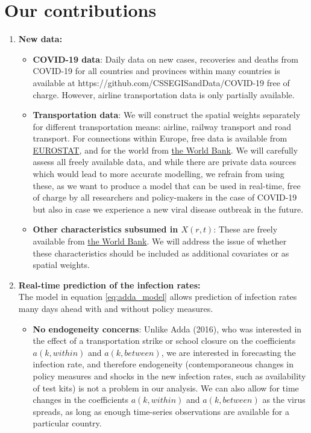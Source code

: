 \documentclass{article}
\begin{document}
\section{Our contributions}
\begin{enumerate}
    \item \textbf{New data:}
        \begin{itemize}
            \item \textbf{COVID-19 data}: Daily data on new cases, recoveries and deaths from COVID-19 for all countries and provinces within many countries is available at https://github.com/CSSEGISandData/COVID-19 free of charge. However, airline transportation data is only partially available.
            \item \textbf{Transportation data}: We will construct the spatial weights separately for different transportation means: airline, railway transport and road transport. For connections within Europe, free data is available from \href{https://ec.europa.eu/eurostat/web/transport/data/main-tables}{EUROSTAT}, and for the world from \href{http://wdi.worldbank.org/table/5.10}{the World Bank}. We will carefully assess all freely available data, and while there are private data sources which would lead to more accurate modelling, we refrain from using these, as we want to produce a model that can be used in real-time, free of charge by all researchers and policy-makers in the case of COVID-19 but also in case we experience a new viral disease outbreak in the future.
            \item \textbf{Other characteristics subsumed in $X(r,t)$}: These are freely available from \href{https://data.worldbank.org/}{the World Bank}. We will address the issue of whether these characteristics should be included as additional covariates or as spatial weights.
        \end{itemize}
    \item \textbf{Real-time prediction of the infection rates:}\\
    The model in equation \eqref{eq:adda_model} allows prediction of infection rates many days ahead with and without policy measures.
        \begin{itemize}
            \item \textbf{No endogeneity concerns}: Unlike Adda (2016), who was interested in the effect of a transportation strike or school closure on the coefficients $a(k, within)$ and $a(k, between)$, we are interested in forecasting the infection rate, and therefore endogeneity (contemporaneous changes in  policy measures and shocks in the new infection rates, such as availability of test kits) is not a problem in our analysis. We can also allow for time changes in the coefficients $a(k, within)$ and $a(k,between)$ as the virus spreads, as long as enough time-series observations are available for a particular country.

\end{itemize}
\end{enumerate}
\end{document}
